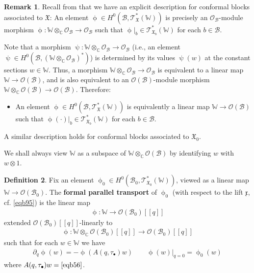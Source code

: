 \documentclass[11pt,b5paper,notitlepage]{article}
\theoremstyle{definition}
\newtheorem{df}{Definition}[subsection]
\newtheorem{rem}[df]{Remark}
\theoremstyle{plain}
\newcommand{\mc}{\mathcal}
\newcommand{\scr}{\mathscr}
\newcommand{\xk}{\mathfrak x}
\newcommand{\blt}{\bullet}
\newcommand{\Wbb}{\mathbb W}
\newcommand{\Cbb}{\mathbb C}
\newcommand{\<}{\left\langle}
\renewcommand{\>}{\right\rangle}
\newcommand{\MB}{\mathcal{B}}
\newcommand{\fx}{\mathfrak{X}}
\newcommand{\ST}{\mathscr{T}}
\numberwithin{equation}{subsection}
\begin{document}
\begin{rem}\label{lbb27}
Recall from \cite[Prop. 2.2.14]{GZ1} that we have an explicit description for conformal blocks associated to $\fx$: An element $\upphi\in H^0(\MB,\scr T^*_\fx(\Wbb))$ is precisely an $\mc O_\MB$-module morphism $\upphi:\Wbb\otimes_\Cbb\mc O_\MB\rightarrow\mc O_\MB$ such that $\upphi|_b\in\scr T_{\fx_b}^*(\Wbb)$ for each $b\in\MB$. 

Note that a morphism $\uppsi:\Wbb\otimes_\Cbb\mc O_\MB\rightarrow\mc O_\MB$ (i.e., an element $\uppsi\in H^0(\MB,(\Wbb\otimes_\Cbb\mc O_\MB)^*)$) is determined by its values $\uppsi(w)$ at the constant sections $w\in\Wbb$. Thus, a morphism $\Wbb\otimes_\Cbb\mc O_\MB\rightarrow\mc O_\MB$ is equivalent to a linear map $\Wbb\rightarrow\mc O(\MB)$, and is also equivalent to an $\mc O(\MB)$-module morphism $\Wbb\otimes_\Cbb\mc O(\MB)\rightarrow \mc O(\MB)$. Therefore:
\begin{itemize}
\item An element $\upphi\in H^0(\MB,\scr T^*_\fx(\Wbb))$ is equivalently a linear map $\Wbb\rightarrow\mc O(\MB)$ such that $\upphi(\cdot)|_b\in\scr T_{\fx_b}^*(\Wbb)$ for each $b\in\MB$.
\end{itemize}
A similar description holds for conformal blocks associated to $\fx_0$. \hfill\qedsymbol
\end{rem}


We shall always view $\Wbb$ as a subspace of $\Wbb\otimes_\Cbb\mc O(\MB)$ by identifying $w$ with $w\otimes 1$.

\begin{df}\label{lbb31}
    Fix an element $\upphi_0\in H^0(\MB_0,\ST_{\fx_0}^*(\Wbb))$, viewed as a linear map $\Wbb\rightarrow\mc O(\MB_0)$. The \textbf{formal parallel transport} of $\upphi_0$ (with respect to the lift $\xk$, cf. \eqref{eqb95}) is the linear map 
    \begin{align*}
        \upphi:\Wbb\rightarrow \mc O(\MB_0)[[q]]
    \end{align*}
extended $\mc O(\MB_0)[[q]]$-linearly to 
   \begin{align}\label{eqb57}
        \upphi:\Wbb\otimes_\Cbb\mc O(\MB_0)[[q]]\rightarrow \mc O(\MB_0)[[q]]
    \end{align}
such that for each $w\in\Wbb$ we have 
\begin{align}\label{eqb53}
\partial_q \upphi(w)=-\upphi(A(q,\tau_\blt)w)\qquad \upphi(w)\big|_{q=0}=\upphi_0(w)
\end{align}
where $A(q,\tau_\blt)w=\eqref{eqb56}$.   
\end{df}
\end{document}
